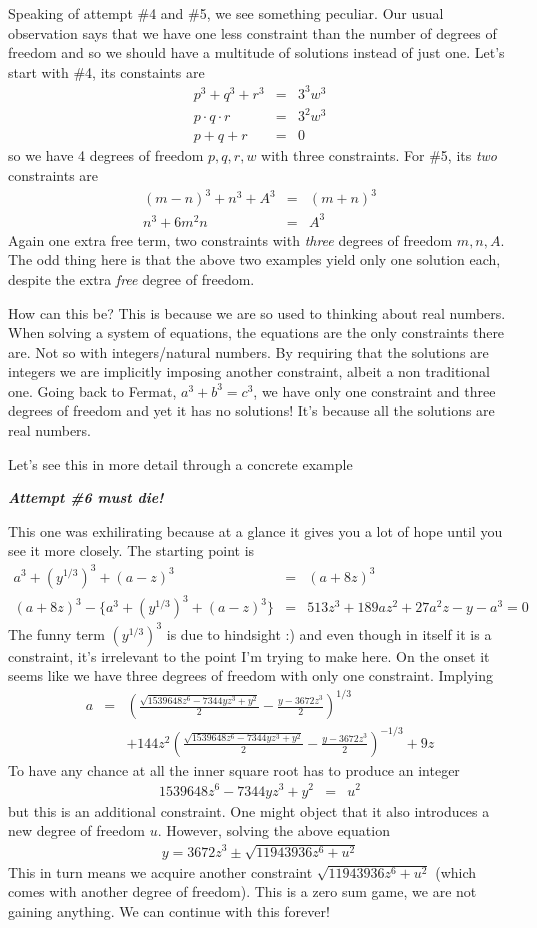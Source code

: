 \documentclass[aps,preprint,preprintnumbers,nofootinbib,showpacs,prd]{revtex4-1}
\newcommand{\nbea}{\begin{eqnarray*}}
\newcommand{\neea}{\end{eqnarray*}}
\begin{document}
Speaking of attempt \#4 and \#5, we see something peculiar. Our usual observation says that we have  one less constraint than the number of degrees of freedom and so we should have a multitude of solutions instead of just one. Let's start with \#4, its constaints are
%
\nbea
p^3 + q^3 + r^3 & = & 3^3 w^3\\
p \cdot q \cdot r & = & 3^2 w^3\\
p + q+ r & = & 0
\neea
%
so we have 4 degrees of freedom $p,q,r,w$ with three constraints. For \#5, its {\it two} constraints are
%
\nbea
(m-n)^3 + n^3 + A^3 & = & (m+n)^3 \\
n^3 + 6 m^2 n & = & A^3
\neea
%
Again one extra free term, two constraints with {\it three} degrees of freedom $m,n,A$. The odd thing here is that the above two examples yield only one solution each, despite the extra {\it free} degree of freedom.

How can this be? This is because we are so used to thinking about real numbers. When solving a system of equations, the equations are the only constraints there are. Not so with integers/natural numbers. By requiring that the solutions are integers we are implicitly imposing another constraint, albeit a non traditional one. Going back to Fermat, $a^3 + b^3 = c^3$, we have only one constraint and three degrees of freedom and yet it has no solutions! It's because all the solutions are real numbers.

Let's see this in more detail through a concrete example

\bigskip\textbf{\textit{Attempt \#6 must die!}}

This one was exhilirating because at  a glance it gives you a lot of hope until you see it more closely. The starting point is
%
\nbea
a^3 + (y^{1/3})^3 + (a-z)^3 & = & (a + 8z)^3 \\
(a + 8z)^3 - \{a^3 + (y^{1/3})^3 + (a-z)^3\} & = & 513 z^3+189 a z^2+27 a^2 z-y-a^3 = 0
\neea
%
The funny term $(y^{1/3})^3$ is due to hindsight :) and even though in itself it is a constraint, it's irrelevant to the point I'm trying to make here. On the onset it seems like we have three degrees of freedom with only one constraint. Implying
%
\nbea
a & = & \left(\frac{\sqrt{1539648z^6-7344yz^3+y^2}}{2}-\frac{y-3672z^3}{2} \right)^{1/3} \\
&& +144z^2 \left ( \frac{\sqrt{1539648z^6-7344yz^3+y^2}}{2}-\frac{y-3672z^3}{2} \right)^{-1/3}+9z
\neea
%
To have any chance at all the inner square root has to produce an integer
%
\nbea
1539648z^6-7344yz^3+y^2 & = & u^2
\neea
%
but this is an additional constraint. One might object that it also introduces a new degree of freedom $u$. However, solving the above equation
%
\nbea
y=3672z^3 \pm \sqrt{11943936z^6+u^2}
\neea
%
This in turn means we acquire another constraint $\sqrt{11943936z^6+u^2}$ (which comes with another degree of freedom). This is a zero sum game, we are not gaining anything. We can continue with this forever!
\end{document}
